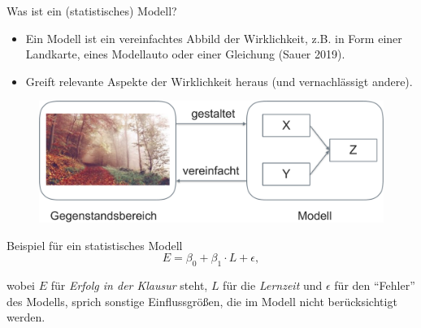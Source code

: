 \documentclass[
  ngerman,
  ignorenonframetext,
]{beamer}
\begin{document}
\begin{frame}{Was ist ein (statistisches) Modell?}
\protect\hypertarget{was-ist-ein-statistisches-modell}{}
\begin{itemize}
\item
  Ein Modell ist ein vereinfachtes Abbild der Wirklichkeit, z.B. in Form
  einer Landkarte, eines Modellauto oder einer Gleichung (Sauer 2019).
\item
  Greift relevante Aspekte der Wirklichkeit heraus (und vernachlässigt
  andere).
\end{itemize}

\begin{figure}[H]
\includegraphics[width=0.7\linewidth]{img/Modell-crop} \end{figure}
\end{frame}

\begin{frame}{Beispiel für ein statistisches Modell}
\protect\hypertarget{beispiel-fuxfcr-ein-statistisches-modell}{}
\[E = \beta_0 + \beta_1\cdot L + \epsilon,\]

wobei \(E\) für \emph{Erfolg in der Klausur} steht, \(L\) für die
\emph{Lernzeit} und \(\epsilon\) für den ``Fehler'' des Modells, sprich
sonstige Einflussgrößen, die im Modell nicht berücksichtigt werden.
\end{frame}
\end{document}
